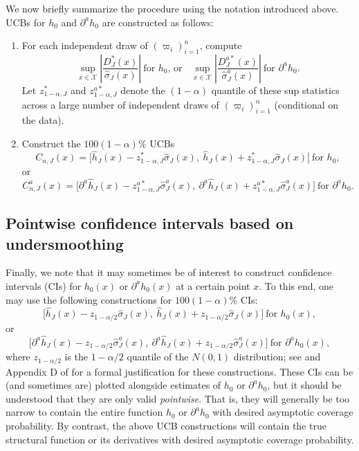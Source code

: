 \documentclass[
]{jss}
\begin{document}
We now briefly summarize the \citet{CCQE} procedure using the notation
introduced above. UCBs for \(h_0\) and \(\partial^a h_0\) are
constructed as follows:

\begin{enumerate}
\item For each independent draw of $(\varpi_i)_{i=1}^n$, compute
\begin{equation} \label{eq:z_star-J-UCB}
 \sup_{x\in \mathcal{X}} \left| \frac{D_J^*(x)}{\hat \sigma_J(x)} \right|~\mbox{for $h_0$, or}~~~~\sup_{x \in \mathcal{X}} \left| \frac{D_J^{a*}(x)}{\hat \sigma_J^a(x)} \right|~\mbox{for $\partial^a h_0$}.
\end{equation}
Let $z_{1-\alpha,J}^*$ and $z_{1-\alpha,J}^{a*}$ denote the $(1-\alpha )$ quantile of
these sup statistics across a large number of independent draws of $(\varpi_i)_{i=1}^n$ (conditional on the data).
\item Construct the $100(1-\alpha)\%$ UCBs
\[
 C_{n,J}(x) = \bigg[ \hat{h}_{J}(x) -  z_{1-\alpha,J}^* \hat \sigma_{J}(x) , ~  \hat{h}_{J}(x) + z_{1-\alpha,J}^* \hat \sigma_{J}(x) \bigg] ~\mbox{for $h_0$},
\]
or
\[
 C_{n,J}^a(x) = \bigg[ \partial^a \hat{h}_{J}(x) - z_{1-\alpha,J}^{a*} \hat \sigma_{J}^a(x) ,~ \partial^a \hat{h}_{J}(x) +  z_{1-\alpha,J}^{a*} \hat \sigma_{J}^a(x) \bigg] ~\mbox{for $\partial^a h_0$}.
\]
\end{enumerate}

\subsection{Pointwise confidence intervals based on
undersmoothing}\label{pw}

Finally, we note that it may sometimes be of interest to construct
confidence intervals (CIs) for \(h_0(x)\) or \(\partial^a h_0(x)\) at a
certain point \(x\). To this end, one may use the following
constructions for \(100(1-\alpha)\%\) CIs: \[
 \bigg[ \hat{h}_{J}(x) -  z_{1-\alpha/2} \hat \sigma_{J}(x) , ~  \hat{h}_{J}(x) + z_{1-\alpha/2} \hat \sigma_{J}(x) \bigg] ~\mbox{for $h_0(x)$},
\] or \[
 \bigg[ \partial^a \hat{h}_{J}(x) - z_{1-\alpha/2} \hat \sigma_{J}^a(x) ,~ \partial^a \hat{h}_{J}(x) +  z_{1-\alpha/2} \hat \sigma_{J}^a(x) \bigg] ~\mbox{for $\partial^a h_0(x)$},
\] where \(z_{1-\alpha/2}\) is the \(1-\alpha/2\) quantile of the
\(N(0,1)\) distribution; see \citet{ChenPouzo} and Appendix D of
\citet{CCQE} for a formal justification for these constructions. These
CIs can be (and sometimes are) plotted alongside estimates of \(h_0\) or
\(\partial^a h_0\), but it should be understood that they are only valid
\emph{pointwise}. That is, they will generally be too narrow to contain
the entire function \(h_0\) or \(\partial^a h_0\) with desired
asymptotic coverage probability. By contrast, the above UCB
constructions will contain the true structural function or its
derivatives with desired asymptotic coverage probability.
\end{document}
